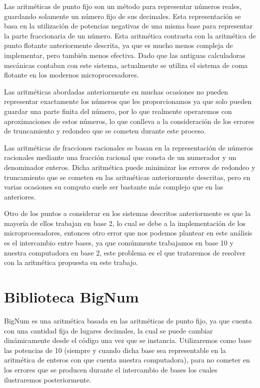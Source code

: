 \documentclass[a4paper,10pt,twocolumn]{article}
\begin{document}
	Las aritméticas de punto fijo son un método para representar números reales, guardando solamente un número fijo de sus decimales. Esta representación se basa en la utilización de potencias negativas de una misma base para representar la parte fraccionaria de un número. Esta aritmética contrasta con la aritmética de punto flotante anteriormente descrita, ya que es mucho menos compleja de implementar, pero también menos efectiva. Dado que las antiguas calculadoras mecánicas contaban con este sistema, actualmente se utiliza el sistema de coma flotante en los modernos microprocesadores.
  
	Las aritméticas abordadas anteriormente en muchas ocasiones no pueden representar exactamente los números que les proporcionamos ya que solo pueden guardar una parte finita del número, por lo que realmente operaremos con aproximaciones de estos números, lo que conlleva a la consideración de los errores de truncamiento y redondeo que se cometen durante este proceso.
  
	Las aritméticas de fracciones racionales se basan en la representación de números racionales mediante una fracción racional que consta de un numerador y un denominador enteros. Dicha aritmética puede minimizar los errores de redondeo y truncamiento que se cometen en las aritméticas anteriormente descritas, pero en varias ocasiones su computo suele ser bastante más complejo que en las anteriores.
  
	Otro de los puntos a considerar en los sistemas descritos anteriormente es que la mayoría de ellos trabajan en base 2, lo cual se debe a la implementación de los microprocesadores, entonces otro error que nos podemos plantear en este análisis es el intercambio entre bases, ya que comúnmente trabajamos en base 10 y nuestra computadora en base 2, este problema es el que trataremos de resolver con la aritmética propuesta en este trabajo.

  
  



\section{Biblioteca BigNum}\label{sec:big_num}
	BigNum es una aritmética basada en las aritméticas de punto fijo, ya que cuenta con una cantidad fija de lugares decimales, la cual se puede cambiar dinámicamente desde el código una vez que se instancia. Utilizaremos como base las potencias de 10 (siempre y cuando dicha base sea representable en la aritmética de enteros con que cuenta nuestra computadora), para no cometer en los errores que se producen durante el intercambio de bases los cuales ilustraremos posteriormente.
\end{document}
